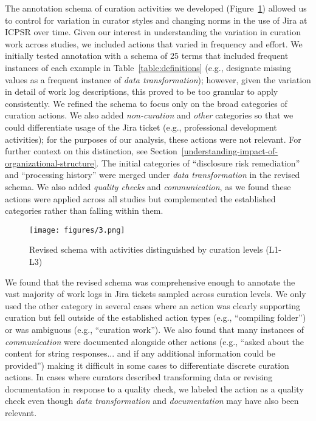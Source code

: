 \documentclass[conference]{IEEEtran}
\begin{document}
The annotation schema of curation activities we developed (Figure~\ref{fig:figure3}) allowed us to control for variation in curator styles and changing norms in the use of Jira at ICPSR over time. Given our interest in understanding the variation in curation work across studies, we included actions that varied in frequency and effort. We initially tested annotation with a schema of 25 terms that included frequent instances of each example in Table~\ref{table:definitions} (e.g., designate missing values as a frequent instance of \textit{data transformation}); however, given the variation in detail of work log descriptions, this proved to be too granular to apply consistently. We refined the schema to focus only on the broad categories of curation actions. We also added \textit{non-curation} and \textit{other} categories so that we could differentiate usage of the Jira ticket (e.g., professional development activities); for the purposes of our analysis, these actions were not relevant. For further context on this distinction, see Section~\ref{understanding-impact-of-organizational-structure}. The initial categories of “disclosure risk remediation” and “processing history” were merged under \textit{data transformation} in the revised schema. We also added \textit{quality checks} and \textit{communication}, as we found these actions were applied across all studies but complemented the established categories rather than falling within them. 

\begin{figure}[b]
\texttt{[image: figures/3.png]}
\caption{Revised schema with activities distinguished by curation levels (L1-L3)}
\label{fig:figure3}
\end{figure}

We found that the revised schema was comprehensive enough to annotate the vast majority of work logs in Jira tickets sampled across curation levels. We only used the other category in several cases where an action was clearly supporting curation but fell outside of the established action types (e.g., “compiling folder”) or was ambiguous (e.g., “curation work”). We also found that many instances of \textit{communication} were documented alongside other actions (e.g., “asked about the content for string responses... and if any additional information could be provided”) making it difficult in some cases to differentiate discrete curation actions. In cases where curators described transforming data or revising documentation in response to a quality check, we labeled the action as a quality check even though \textit{data transformation} and \textit{documentation} may have also been relevant.
\end{document}
